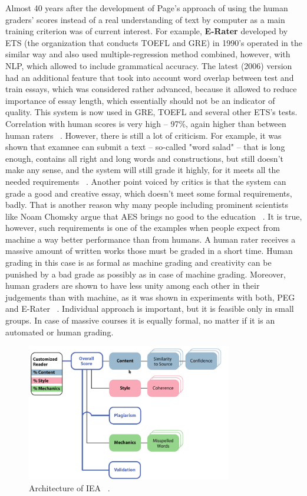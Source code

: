 Almost 40 years after the development of Page's approach of using the human graders' scores instead of a real understanding of text by computer as a main training criterion was of current interest. For example, \textbf{E-Rater} developed by ETS (the organization that conducts TOEFL and GRE) in 1990's operated in the similar way and also used multiple-regression method combined, however, with NLP, which allowed to include grammatical accuracy. The latest (2006) version had an additional feature that took into account word overlap between test and train essays, which was considered rather advanced, because it allowed to reduce importance of essay length, which essentially should not be an indicator of quality. This system is now used in GRE, TOEFL and several other ETS's tests. Correlation with human scores is very high -- 97\%, again higher than between human raters ~\cite{Blood}. However, there is still a lot of criticism. For example, it was shown that examnee can submit a text -- so-called "word salad" -- that is long enough, contains all right and long words and constructions, but still doesn't make any sense, and the system will still grade it highly, for it meets all the needed requirements ~\cite{Hearst}. Another point voiced by critics is that the system can grade a good and creative essay, which doesn't meet some formal requirements, badly. That is another reason why many people including prominent scientists like Noam Chomsky argue that AES brings no good to the education ~\cite{petition}. It is true, however, such requirements is one of the examples when people expect from machine a way better performance than from humans. A human rater receives a massive amount of written works those must be graded in a short time. Human grading in this case is as formal as machine grading and creativity can be punished by a bad grade as possibly as in case of machine grading. Moreover, human graders are shown to have less unity among each other in their judgements than with machine, as it was shown in experiments with both, PEG and E-Rater ~\cite{Blood}. Individual approach is important, but it is feasible only in small groups. In case of massive courses it is equally formal, no matter if it is an automated or human grading.\\

\begin{figure}[h!]
  \centering
  \includegraphics[width=0.8\textwidth]{img/IEAArch}
    \caption{Architecture of IEA ~\cite{aesOverview}.\label{fig:IEAArch}}
\end{figure}

